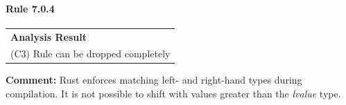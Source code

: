\paragraph{Rule 7.0.4}
\begin{longtable}{p{13cm}}
\textbf{Analysis Result} \\
(C3) Rule can be dropped completely \\
\end{longtable}
\textbf{Comment:} Rust enforces matching left- and right-hand types during compilation. It is not possible to shift with values greater than the \textit{lvalue} type. \\



